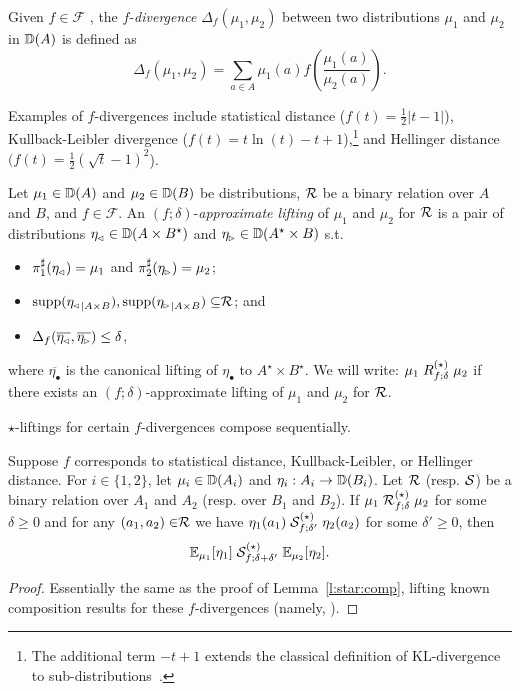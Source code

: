 \documentclass{lmcs}
\begin{document}
\begin{defi}
  Given $f \in \mathcal{F}$ , the $f$-\emph{divergence} $\Delta_f (\mu_1,\mu_2)$
  between two distributions $\mu_1$ and $\mu_2$  in ${\mathbb{D}}(A)$ is defined as
  \[
    \Delta_f (\mu_1,\mu_2)  = 
      \sum_{a\in A} \mu_1(a)f\left( \frac{\mu_1(a)}{\mu_2(a)} \right) .
  \]  
\end{defi}

Examples of $f$-divergences include statistical distance ($f(t)= \frac{1}{2}
\left| t - 1 \right|$), Kullback-Leibler divergence ($f(t)= t \ln (t) - t +
1$),\footnote{%
  The additional term $- t + 1$ extends the classical definition of
KL-divergence to sub-distributions~\citep{BartheO13}.}
and Hellinger distance $(f(t)=\frac{1}{2} (\sqrt{t}-1)^2$).

\begin{defi}
  Let $\mu_1 \in {\mathbb{D}}(A)$ and $\mu_2 \in {\mathbb{D}}(B)$ be distributions,
  $\mathrel{\mathcal{R}}$ be a binary relation over
  $A$ and $B$, and $f\in\mathcal{F}$.
  An $(f; \delta)$-\emph{approximate lifting} of
  $\mu_1$ and $\mu_2$ for $\mathrel{\mathcal{R}}$ is a pair of distributions
  $\eta_{\mspace{-1.5mu}{\scriptscriptstyle \vartriangleleft}} \in {\mathbb{D}}(A \times B^\star)$ and
  $\eta_{\mspace{-1.5mu}{\scriptscriptstyle \vartriangleright}} \in {\mathbb{D}}(A^\star \times B)$ s.t.
  \begin{itemize}
  \item $\pi_{1}^{\sharp}(\eta_{\mspace{-1.5mu}{\scriptscriptstyle \vartriangleleft}}) = \mu_1$ and $\pi_{2}^{\sharp}(\eta_{\mspace{-1.5mu}{\scriptscriptstyle \vartriangleright}}) = \mu_2$;
  \item
    $\operatorname{supp}({\eta_{\mspace{-1.5mu}{\scriptscriptstyle \vartriangleleft}}}_{|A \times B}) ,
     \operatorname{supp}({\eta_{\mspace{-1.5mu}{\scriptscriptstyle \vartriangleright}}}_{|A \times B}) \subseteq \mathrel{\mathcal{R}}$; and
  \item $\Delta_{f}(
           \overline{\eta_{\mspace{-1.5mu}{\scriptscriptstyle \vartriangleleft}}},
           \overline{\eta_{\mspace{-1.5mu}{\scriptscriptstyle \vartriangleright}}}) \leq \delta$,
  \end{itemize}
  where $\overline{\eta_{\bullet}}$ is the canonical lifting of $\eta_{\bullet}$
  to $A^\star \times B^\star$.
   We will write:
  $ \mu_1 \mathrel{R^{(\star)}_{f; \delta}} \mu_2$
  if there exists an $(f; \delta)$-approximate lifting of
  $\mu_1$ and $\mu_2$ for $\mathrel{\mathcal{R}}$.
\end{defi}

$\star$-liftings for certain $f$-divergences compose sequentially.

\begin{lem} \label{l:flift:basics}
  Suppose $f$ corresponds to statistical distance, Kullback-Leibler, or
  Hellinger distance. For $i \in \{ 1, 2 \}$, let $\mu_i \in {\mathbb{D}}(A_i)$ and
  $\eta_i : A_i \to {\mathbb{D}}(B_i)$. Let $\mathrel{\mathcal{R}}$ (resp. $\mathrel{\mathcal{S}}$) be a binary relation
  over $A_1$ and $A_2$ (resp. over $B_1$ and $B_2$). If
  $\mu_1 \mathrel{\mathrel{\mathcal{R}}^{(\star)}_{f;\delta}} \mu_2$
  for some $\delta \geq 0$ and for any $(a_1, a_2) \in \mathrel{\mathcal{R}}$ we have
  $\eta_1(a_1) \mathrel{\mathrel{\mathcal{S}}^{(\star)}_{f;\delta'}} \eta_2(a_2)$
  for some $\delta' \geq 0$,
  then
  \[ \mathbb{E}_{{\mu_1}} [{\eta_1}]
    \mathrel{\mathrel{\mathcal{S}}^{(\star)}_{f; \delta + \delta'}}
    \mathbb{E}_{{\mu_2}} [{\eta_2}] . \]
\end{lem}
\begin{proof}
  Essentially the same as the proof of Lemma~\ref{l:star:comp}, lifting known
  composition results for these $f$-divergences (namely, \citet[Proposition
  5]{BartheO13}).
\end{proof}
\end{document}
